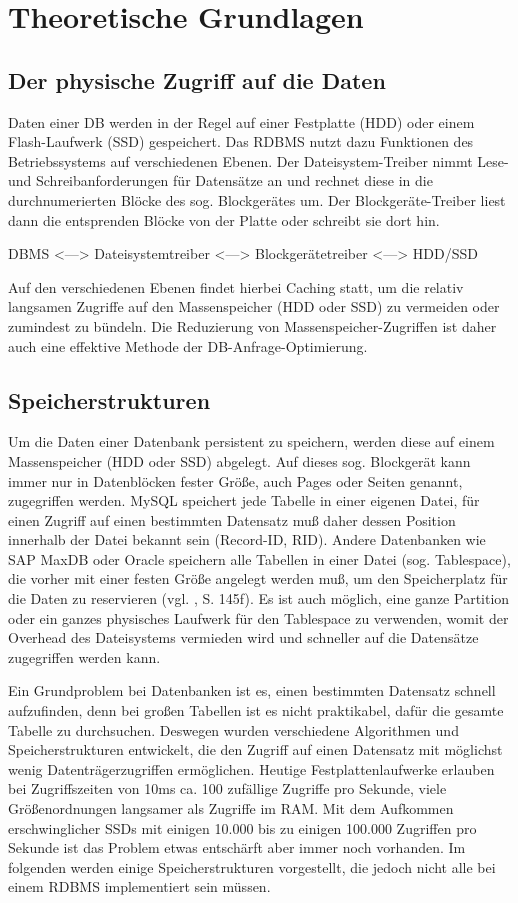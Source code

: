 \section{Theoretische Grundlagen}
\subsection{Der physische Zugriff auf die Daten}
Daten einer DB werden in der Regel auf einer Festplatte (HDD) oder einem Flash-Laufwerk (SSD) gespeichert.
Das RDBMS nutzt dazu Funktionen des Betriebssystems auf verschiedenen Ebenen.
Der Dateisystem-Treiber nimmt Lese- und Schreibanforderungen für Datensätze an und rechnet diese in die durchnumerierten Blöcke des sog. Blockgerätes um. Der Blockgeräte-Treiber liest dann die entsprenden Blöcke von der Platte oder schreibt sie dort hin.

DBMS <---> Dateisystemtreiber <---> Blockgerätetreiber <---> HDD/SSD 

Auf den verschiedenen Ebenen findet hierbei Caching statt, um die relativ langsamen Zugriffe auf den Massenspeicher (HDD oder SSD) zu vermeiden oder zumindest zu bündeln. Die Reduzierung von Massenspeicher-Zugriffen ist  daher auch eine effektive Methode der DB-Anfrage-Optimierung.

\subsection{Speicherstrukturen}
Um die Daten einer Datenbank persistent zu speichern, werden diese auf einem Massenspeicher (HDD oder SSD)  abgelegt. Auf dieses sog. Blockgerät kann immer nur in Datenblöcken fester Größe, auch Pages oder Seiten genannt, zugegriffen werden. MySQL speichert jede Tabelle in einer eigenen Datei, für einen Zugriff auf einen bestimmten Datensatz muß daher dessen Position innerhalb der Datei bekannt sein (Record-ID, RID). Andere Datenbanken wie SAP MaxDB oder Oracle speichern alle Tabellen in einer Datei (sog. Tablespace), die vorher mit einer festen Größe angelegt werden muß, um den Speicherplatz für die Daten zu reservieren (vgl. \cite{Sauer1998}, S. 145f). Es ist auch möglich, eine ganze Partition oder ein ganzes physisches Laufwerk für den Tablespace zu verwenden, womit der Overhead des Dateisystems vermieden wird und schneller auf die Datensätze zugegriffen werden kann.

Ein Grundproblem bei Datenbanken ist es, einen bestimmten Datensatz schnell aufzufinden, denn bei großen Tabellen ist es nicht praktikabel, dafür die gesamte Tabelle zu durchsuchen. Deswegen wurden verschiedene Algorithmen und Speicherstrukturen entwickelt, die den Zugriff auf einen Datensatz mit möglichst wenig Datenträgerzugriffen ermöglichen. Heutige Festplattenlaufwerke erlauben bei Zugriffszeiten von 10ms ca. 100 zufällige Zugriffe pro Sekunde, viele Größenordnungen langsamer als Zugriffe im RAM. Mit dem Aufkommen erschwinglicher SSDs mit einigen 10.000 bis zu einigen 100.000 Zugriffen pro Sekunde ist das Problem etwas entschärft aber immer noch vorhanden. Im folgenden werden einige Speicherstrukturen vorgestellt, die jedoch nicht alle bei einem RDBMS implementiert sein müssen.
